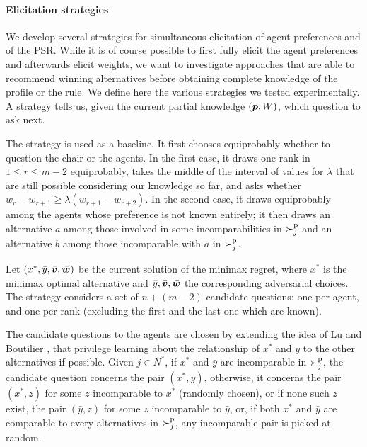 \documentclass[runningheads]{llncs}
\begin{document}
\paragraph{Elicitation strategies}
We develop several strategies for simultaneous elicitation of agent preferences and of the PSR.
While it is of course possible to first fully elicit the agent preferences and afterwards elicit weights, we want to investigate approaches that are able to recommend winning alternatives before obtaining complete knowledge of the profile or the rule.
We define here the various strategies we tested experimentally. A strategy tells us, given the current partial knowledge $({\bm{p}}, W)$, which question to ask next.

The  strategy is used as a baseline. %
It first chooses equiprobably whether to question the chair or the agents. In the first case, it draws one rank in $1 ≤ r ≤ m-2$ equiprobably, takes the middle of the interval of values for $\lambda$ that are still possible considering our knowledge so far, and asks whether $w_r - w_{r+1} ≥ \lambda (w_{r+1} - w_{r+2})$.
In the second case, it draws equiprobably among the agents whose preference is not known entirely; it then draws an alternative $a$ among those involved in some incomparabilities in $\succ^\text{p}_j$ and an alternative $b$ among those incomparable with $a$ in $\succ^\text{p}_j$.

Let $(x^{*},\bar{y}, \bar{\bm{v}}, \bar{\bm{w}})$ be the current solution of the minimax regret, where $x^{*}$ is the minimax optimal alternative and $\bar{y}, \bar{\bm{v}}, \bar{\bm{w}}$ the corresponding adversarial choices. 
The  strategy considers a set of $n + (m-2)$ candidate questions: one per agent, and one per rank (excluding the first and the last one which are known).

The candidate questions to the agents are chosen by extending the idea of Lu and Boutilier \cite{Lu2011}, that privilege learning about the relationship of $x^*$ and $\bar{y}$ to the other alternatives if possible.
Given $j \in N^*$, if $x^*$ and $\bar{y}$ are incomparable in $\succ^\text{p}_j$, the candidate question concerns the pair $(x^*, \bar{y})$, otherwise, %
it concerns the pair $(x^*, z)$ for some $z$ incomparable to $x^*$ (randomly chosen), or if none such $z$ exist, the pair $(\bar{y}, z)$ for some $z$ incomparable to $\bar{y}$, or, if both $x^*$ and $\bar{y}$ are comparable to every alternatives in $\succ^\text{p}_j$, any incomparable pair is picked at random. 
\end{document}
